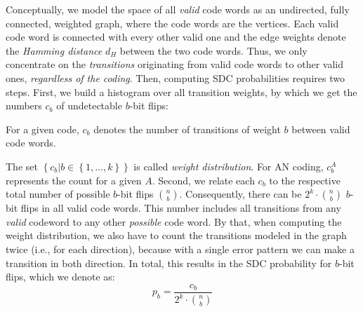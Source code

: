Conceptually, we model the space of all \emph{valid} code words as an undirected, fully connected, weighted graph, where the code words are the vertices. Each valid code word is connected with every other valid one and the edge weights denote the \emph{Hamming distance} $d_H$ between the two code words. Thus, we only concentrate on the \emph{transitions} originating from valid code words to other valid ones, \emph{regardless of the coding}. Then, computing SDC probabilities requires two steps. First, we build a histogram over all transition weights, by which we get the numbers $c_b$ of undetectable $b$-bit flips:
\begin{Definition}
For a given code, $c_b$ denotes the number of transitions of weight \(b\) between valid code words.
\end{Definition}
The set \(\left\{c_b | b \in \left\{1,\dots,k\right\}\right\}\) is called \emph{weight distribution}. For AN coding, $c^A_b$ represents the count for a given \(A\). Second, we relate each $c_b$ to the respective total number of possible $b$-bit flips $\binom{n}{b}$.
Consequently, there can be $2^k \cdot \binom{n}{b}$ $b$-bit flips in all valid code words. This number includes all transitions from any \emph{valid} codeword to any other \emph{possible} code word. By that, when computing the weight distribution, we also have to count the transitions modeled in the graph twice (i.e., for each direction), because with a single error pattern we can make a transition in both direction. In total, this results in the SDC probability for $b$-bit flips, which we denote as:
\begin{equation}
p_b  = \frac{c_b}{2^k \cdot \binom{n}{b}}
\label{eq:sdc}
\end{equation}

